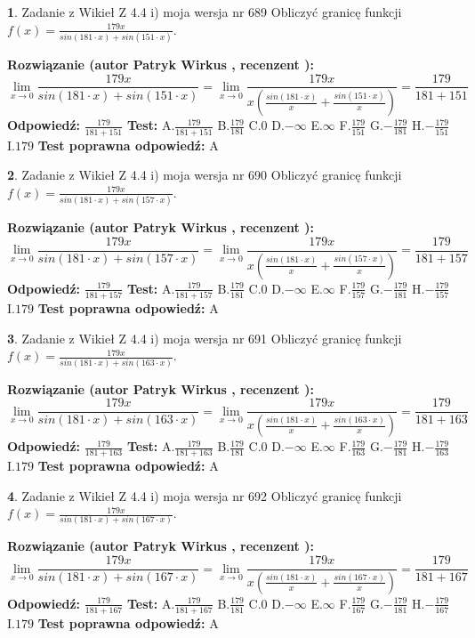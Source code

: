 \documentclass[12pt, a4paper]{article}
\theoremstyle{definition} %
\newtheorem{zad}{}
\newcommand{\zadStart}[1]{\begin{zad}#1\newline}
\newcommand{\zadStop}{\end{zad}}
\newcommand{\rozwStart}[2]{\noindent \textbf{Rozwiązanie (autor #1 , recenzent #2): }\newline}
\newcommand{\rozwStop}{\newline}
\newcommand{\odpStart}{\noindent \textbf{Odpowiedź:}\newline}
\newcommand{\odpStop}{\newline}
\newcommand{\testStart}{\noindent \textbf{Test:}\newline}
\newcommand{\testStop}{\newline}
\newcommand{\kluczStart}{\noindent \textbf{Test poprawna odpowiedź:}\newline}
\newcommand{\kluczStop}{\newline}
\begin{document}
\zadStart{Zadanie z Wikieł Z 4.4 i) moja wersja nr 689}
Obliczyć granicę funkcji $f(x)=\frac{179x}{sin(181\cdot x) +sin(151\cdot x)}$.
\zadStop
\rozwStart{Patryk Wirkus}{}
$$\lim\limits_{x\to 0}\frac{179x}{sin(181\cdot x) +sin(151\cdot x)}=\lim\limits_{x\to 0}\frac{179x}{x(\frac{sin(181\cdot x)}{x}+\frac{sin(151\cdot x)}{x})}=\frac{179}{181+151}$$
\rozwStop
\odpStart
$\frac{179}{181+151}$
\odpStop
\testStart
A.$\frac{179}{181+151}$
B.$\frac{179}{181}$
C.$0$
D.$-\infty$
E.$\infty$
F.$\frac{179}{151}$
G.$-\frac{179}{181}$
H.$-\frac{179}{151}$
I.$179$
\testStop
\kluczStart
A
\kluczStop



\zadStart{Zadanie z Wikieł Z 4.4 i) moja wersja nr 690}
Obliczyć granicę funkcji $f(x)=\frac{179x}{sin(181\cdot x) +sin(157\cdot x)}$.
\zadStop
\rozwStart{Patryk Wirkus}{}
$$\lim\limits_{x\to 0}\frac{179x}{sin(181\cdot x) +sin(157\cdot x)}=\lim\limits_{x\to 0}\frac{179x}{x(\frac{sin(181\cdot x)}{x}+\frac{sin(157\cdot x)}{x})}=\frac{179}{181+157}$$
\rozwStop
\odpStart
$\frac{179}{181+157}$
\odpStop
\testStart
A.$\frac{179}{181+157}$
B.$\frac{179}{181}$
C.$0$
D.$-\infty$
E.$\infty$
F.$\frac{179}{157}$
G.$-\frac{179}{181}$
H.$-\frac{179}{157}$
I.$179$
\testStop
\kluczStart
A
\kluczStop



\zadStart{Zadanie z Wikieł Z 4.4 i) moja wersja nr 691}
Obliczyć granicę funkcji $f(x)=\frac{179x}{sin(181\cdot x) +sin(163\cdot x)}$.
\zadStop
\rozwStart{Patryk Wirkus}{}
$$\lim\limits_{x\to 0}\frac{179x}{sin(181\cdot x) +sin(163\cdot x)}=\lim\limits_{x\to 0}\frac{179x}{x(\frac{sin(181\cdot x)}{x}+\frac{sin(163\cdot x)}{x})}=\frac{179}{181+163}$$
\rozwStop
\odpStart
$\frac{179}{181+163}$
\odpStop
\testStart
A.$\frac{179}{181+163}$
B.$\frac{179}{181}$
C.$0$
D.$-\infty$
E.$\infty$
F.$\frac{179}{163}$
G.$-\frac{179}{181}$
H.$-\frac{179}{163}$
I.$179$
\testStop
\kluczStart
A
\kluczStop



\zadStart{Zadanie z Wikieł Z 4.4 i) moja wersja nr 692}
Obliczyć granicę funkcji $f(x)=\frac{179x}{sin(181\cdot x) +sin(167\cdot x)}$.
\zadStop
\rozwStart{Patryk Wirkus}{}
$$\lim\limits_{x\to 0}\frac{179x}{sin(181\cdot x) +sin(167\cdot x)}=\lim\limits_{x\to 0}\frac{179x}{x(\frac{sin(181\cdot x)}{x}+\frac{sin(167\cdot x)}{x})}=\frac{179}{181+167}$$
\rozwStop
\odpStart
$\frac{179}{181+167}$
\odpStop
\testStart
A.$\frac{179}{181+167}$
B.$\frac{179}{181}$
C.$0$
D.$-\infty$
E.$\infty$
F.$\frac{179}{167}$
G.$-\frac{179}{181}$
H.$-\frac{179}{167}$
I.$179$
\testStop
\kluczStart
A
\kluczStop
\end{document}
